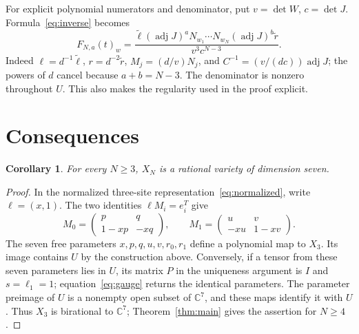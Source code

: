 \documentclass[11pt]{article}
\newtheorem{corollary}{Corollary}
\newcommand{\C}{\mathbb C}
\newcommand{\adj}{\operatorname{adj}}
\begin{document}
For explicit polynomial numerators and denominator, put $v=\det W$,
$c=\det J$. Formula~\eqref{eq:inverse} becomes
\begin{equation}\label{eq:polynomial}
 F_{N,a}(t)_w=
 \frac{\widetilde\ell(\adj J)^aN_{w_1}\cdots N_{w_N}
 (\adj J)^b\widetilde r}{v^3c^{N-3}}.
\end{equation}
Indeed $\ell=d^{-1}\widetilde\ell$,
$r=d^{-2}\widetilde r$, $M_j=(d/v)N_j$, and
$C^{-1}=(v/(dc))\adj J$; the powers of $d$ cancel because $a+b=N-3$.
The denominator is nonzero throughout $U$. This also makes the
regularity used in the proof explicit.

\section{Consequences}
\begin{corollary}\label{cor:rational}
For every $N\geq3$, $X_N$ is a rational variety of dimension seven.
\end{corollary}
\begin{proof}
In the normalized three-site representation~\eqref{eq:normalized}, write
$\ell=(x,1)$. The two identities $\ell M_i=e_i^T$ give
\[
 M_0=\begin{pmatrix}p&q\\1-xp&-xq\end{pmatrix},\qquad
 M_1=\begin{pmatrix}u&v\\-xu&1-xv\end{pmatrix}.
\]
The seven free parameters $x,p,q,u,v,r_0,r_1$ define a polynomial
map to $X_3$. Its image contains $U$ by the construction above.
Conversely, if a tensor from these seven parameters lies in $U$,
its matrix $P$ in the uniqueness argument is $I$ and $s=\ell_1=1$;
equation~\eqref{eq:gauge} returns the identical parameters. The
parameter preimage of $U$ is a nonempty open subset of $\C^7$,
and these maps identify it with $U$. Thus $X_3$ is birational to
$\C^7$; Theorem~\ref{thm:main} gives the assertion for $N\geq4$.
\end{proof}
\end{document}
